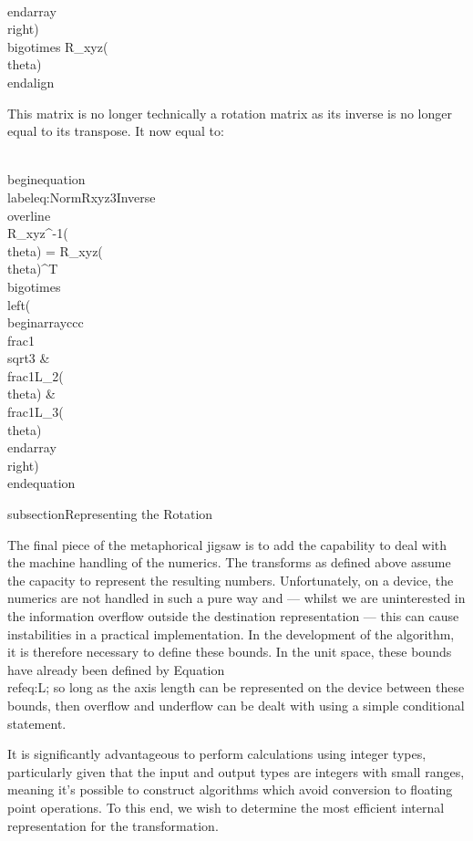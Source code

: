 \\end{array}
\\right)
\\bigotimes
R_{xyz}(\\theta)
\\end{align}

This matrix is no longer technically a rotation matrix as its inverse is no longer equal to its transpose. It now equal to:

\\begin{equation}\\label{eq:NormRxyz3Inverse}
 \\overline{\\R}_{xyz}^{-1}(\\theta) =
 R_{xyz}(\\theta)^{T} \\bigotimes
\\left(
\\begin{array}{ccc}
 \\frac{1}{\\sqrt{3}}  &
 \\frac{1}{L_2(\\theta)} &
 \\frac{1}{L_3(\\theta) }
\\end{array}
\\right)
\\end{equation}

subsection{Representing the Rotation}

The final piece of the metaphorical jigsaw is to add the capability to deal with the machine handling of the numerics. The transforms as defined above assume the capacity to represent the resulting numbers. Unfortunately, on a device, the numerics are not handled in such a pure way and --- whilst we are uninterested in the information overflow outside the destination representation --- this can cause instabilities in a practical implementation. In the development of the algorithm, it is therefore necessary to define these bounds. In the unit space, these bounds have already been defined by Equation~\\ref{eq:L}; so long as the axis length can be represented on the device between these bounds, then overflow and underflow can be dealt with using a simple conditional statement.

It is significantly advantageous to perform calculations using integer types, particularly given that the input and output types are integers with small ranges, meaning it's possible to construct algorithms which avoid conversion to floating point operations. To this end, we wish to determine the most efficient internal representation for the transformation.

